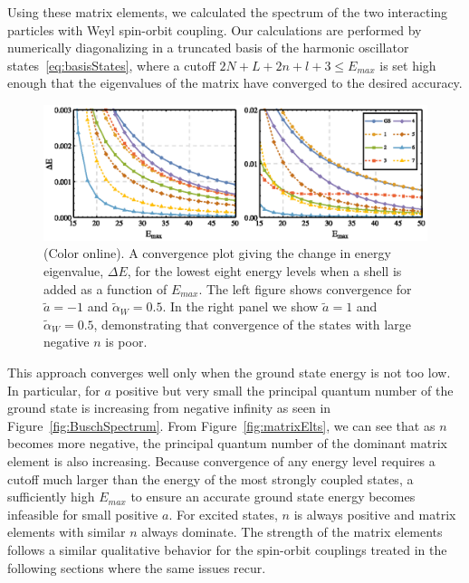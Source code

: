 \documentclass[%
 notitlepage,
 preprint,
showpacs,%
 amsmath,amssymb,
 aps,
pra,
]{revtex4-1}
\begin{document}
Using these matrix elements, we calculated the spectrum of the two interacting particles with Weyl spin-orbit coupling. Our calculations are performed by numerically diagonalizing in a truncated basis of the harmonic oscillator states~\eqref{eq:basisStates}, where a cutoff $2N+L+2n+l+3\leq E_{max}$ is set high enough that the eigenvalues of the matrix have converged to the desired accuracy.  

\begin{figure}
\includegraphics{Figures/WeylConvergence}
\caption{\label{fig:WeylConvergence}(Color online).  A convergence plot giving the change in energy eigenvalue, $\Delta E$, for the lowest eight energy levels when a shell is added as a function of $E_{max}$.  The left figure shows convergence for $\tilde{a}=-1$ and $\tilde{\alpha}_W=0.5$. In the right panel  we show $\tilde{a}=1$ and $\tilde{\alpha}_W=0.5$, demonstrating that convergence of the states with large negative $n$ is poor.} 
\end{figure}

This approach converges well only when the ground state energy is not too low. In particular, for $a$ positive but very small the principal quantum number of the ground state is increasing from negative infinity as seen in Figure~\ref{fig:BuschSpectrum}. From Figure~\ref{fig:matrixElts}, we can see that as $n$ becomes more negative, the principal quantum number of the dominant matrix element is also increasing. Because convergence of any energy level requires a cutoff much larger than the energy of the most strongly coupled states, a sufficiently high $E_{max}$ to ensure an accurate ground state energy becomes infeasible for small positive $a$. For excited states, $n$ is always positive and matrix elements with similar $n$ always dominate. The strength of the matrix elements follows a similar qualitative behavior for the spin-orbit couplings treated in the following sections where the same issues recur. 
\end{document}
